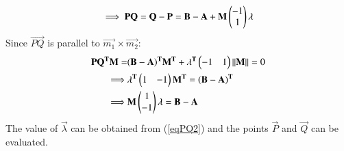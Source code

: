 \documentclass[journal,12pt,twocolumn]{IEEEtran}
\begin{document}
\begin{align}
	\implies \vec{PQ} = \vec{Q}-\vec{P} = \vec{B}-\vec{A} 
			   + \vec{M}\myvec{-1\\1}\vec{\lambda}  \label{eqPQ1}
\end{align}
Since $\vec{PQ}$ is parallel to $\vec{m_1} \times \vec{m_2}$:
\begin{align}
	\vec{PQ^T}\vec{M} =& \vec{(B-A)^T}\vec{M^T} 
	    +\vec{\lambda^T}\myvec{-1  & 1}\norm{\vec{M}}=0  \\
	\implies & \vec{\lambda^T}\myvec{1 & -1}\vec{M^T} = \vec{(B-A)^T} \\
	\implies & \vec{M}\myvec{1 \\ -1}\vec{\lambda} = \vec{B-A} \label{eqPQ2} 
\end{align}
The value of $\vec{\lambda}$ can be obtained from (\ref{eqPQ2}) and the points 
	$\vec{P}$ and $\vec{Q}$ can be evaluated. 
\end{document}
